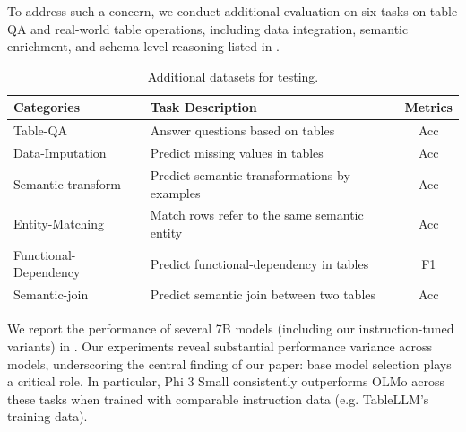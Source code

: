 \documentclass[11pt]{article}
\begin{document}
To address such a concern, we conduct additional evaluation on six tasks on table QA and real-world table operations, including data integration, semantic enrichment, and schema-level reasoning \citep{xing2025mmtu, chen2021finqa, cafarella2008webtables, he2015sema, abedjan2016dataxformer} listed in .


\begin{table}[t]
\small
\centering
\begin{tabular}{p{5em}p{12em}c}
\toprule
\textbf{Categories}   & \textbf{Task Description}                    & \textbf{Metrics} \\
\midrule
Table-QA              & Answer questions based on tables             & Acc              \\
Data-Imputation       & Predict missing values in tables             & Acc              \\
Semantic-transform    & Predict semantic transformations by examples & Acc              \\
Entity-Matching       & Match rows refer to the same semantic entity & Acc              \\
Functional-Dependency & Predict functional-dependency in tables      & F1               \\
Semantic-join         & Predict semantic join between two tables     & Acc         \\
\bottomrule
\end{tabular}
\caption{Additional datasets for testing.}
\label{tab: addi-data}
\end{table}

We report the performance of several 7B models (including our instruction-tuned variants) in .
Our experiments reveal substantial performance variance across models, underscoring the central finding of our paper: base model selection plays a critical role. 
In particular, Phi 3 Small consistently outperforms OLMo across these tasks when trained with comparable instruction data (e.g. TableLLM’s training data).
\end{document}
